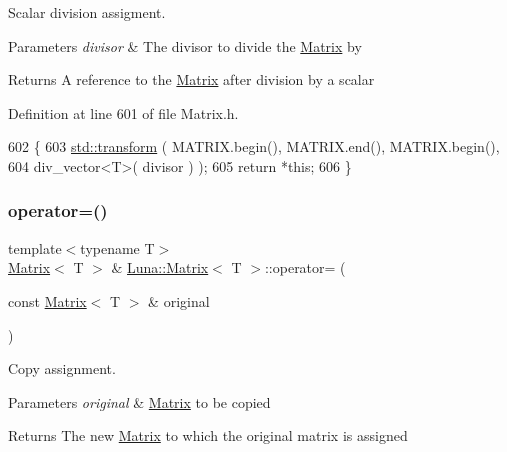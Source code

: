 Scalar division assigment. 


\begin{DoxyParams}{Parameters}
{\em divisor} & The divisor to divide the \hyperlink{classLuna_1_1Matrix}{Matrix} by \\
\hline
\end{DoxyParams}
\begin{DoxyReturn}{Returns}
A reference to the \hyperlink{classLuna_1_1Matrix}{Matrix} after division by a scalar 
\end{DoxyReturn}


Definition at line 601 of file Matrix.\+h.


\begin{DoxyCode}
602   \{
603     \hyperlink{namespaceHeat__plot_aeaa6785bedcad63b4bd40e8cb1bad8a0}{std::transform} ( MATRIX.begin(), MATRIX.end(), MATRIX.begin(),
604                      div\_vector<T>( divisor ) );
605     \textcolor{keywordflow}{return} *\textcolor{keyword}{this};
606   \}
\end{DoxyCode}
\mbox{\label{classLuna_1_1Matrix_a80e1ec59594b0fd5ede4d7f53aa9aa7c}} 
\subsubsection{\texorpdfstring{operator=()}{operator=()}}
{\footnotesize\ttfamily template$<$typename T$>$ \\
\hyperlink{classLuna_1_1Matrix}{Matrix}$<$ T $>$ \& \hyperlink{classLuna_1_1Matrix}{Luna\+::\+Matrix}$<$ T $>$\+::operator= (\begin{DoxyParamCaption}\item[{const \hyperlink{classLuna_1_1Matrix}{Matrix}$<$ T $>$ \&}]{original }\end{DoxyParamCaption})\hspace{0.3cm}{\ttfamily [inline]}}



Copy assignment. 


\begin{DoxyParams}{Parameters}
{\em original} & \hyperlink{classLuna_1_1Matrix}{Matrix} to be copied \\
\hline
\end{DoxyParams}
\begin{DoxyReturn}{Returns}
The new \hyperlink{classLuna_1_1Matrix}{Matrix} to which the original matrix is assigned 
\end{DoxyReturn}


